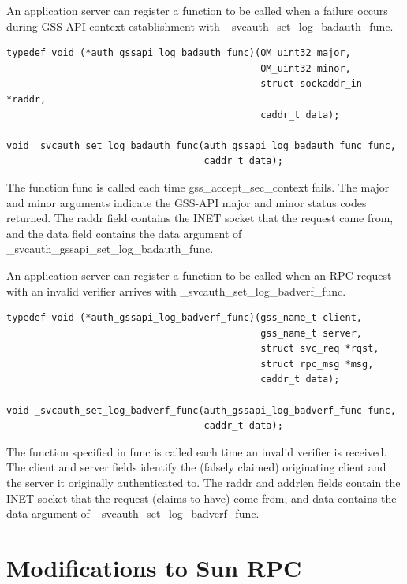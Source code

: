 An application server can register a function to be called when a
failure occurs during GSS-API context establishment with
_svcauth_set_log_badauth_func.

\begin{verbatim}
typedef void (*auth_gssapi_log_badauth_func)(OM_uint32 major,
                                             OM_uint32 minor,
                                             struct sockaddr_in *raddr,
                                             caddr_t data);

void _svcauth_set_log_badauth_func(auth_gssapi_log_badauth_func func,
                                   caddr_t data);
\end{verbatim}

The function func is called each time gss_accept_sec_context fails.
The major and minor arguments indicate the GSS-API major and minor
status codes returned.  The raddr field contains the INET socket that
the request came from, and the data field contains the data argument
of _svcauth_gssapi_set_log_badauth_func.

An application server can register a function to be called when an RPC
request with an invalid verifier arrives with
_svcauth_set_log_badverf_func.

\begin{verbatim}
typedef void (*auth_gssapi_log_badverf_func)(gss_name_t client,
                                             gss_name_t server,
                                             struct svc_req *rqst,
                                             struct rpc_msg *msg,
                                             caddr_t data);

void _svcauth_set_log_badverf_func(auth_gssapi_log_badverf_func func,
                                   caddr_t data);
\end{verbatim}

The function specified in func is called each time an invalid verifier
is received.  The client and server fields identify the (falsely
claimed) originating client and the server it originally authenticated
to.  The raddr and addrlen fields contain the INET socket that the
request (claims to have) come from, and data contains the data
argument of _svcauth_set_log_badverf_func.

\section{Modifications to Sun RPC}

